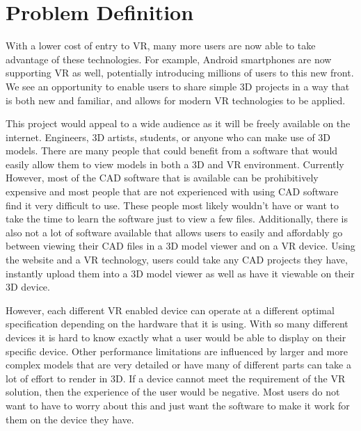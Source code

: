 \documentclass[letterpaper,10pt,draftclsnofoot,onecolumn, titlepage]{IEEEtran}
\begin{document}
\section{Problem Definition}
{With a lower cost of entry to VR, many more users are now able to take advantage of these technologies. For example, Android smartphones are now supporting VR as well, potentially introducing millions of users to this new front. We see an opportunity to enable users to share simple 3D projects in a way that is both new and familiar, and allows for modern VR technologies to be applied. 

This project would appeal to a wide audience as it will be freely available on the internet. Engineers, 3D artists, students, or anyone who can make use of 3D models. There are many people that could benefit from a software that would easily allow them to view models in both a 3D and VR environment. Currently However, most of the CAD software that is available can be prohibitively expensive and most people that are not experienced with using CAD software find it very difficult to use. These people most likely wouldn’t have or want to take the time to learn the software just to view a few files. Additionally, there is also not a lot of software available that allows users to easily and affordably go between viewing their CAD files in a 3D model viewer and on a VR device. Using the website and a VR technology, users could take any CAD projects they have, instantly upload them into a 3D model viewer as well as have it viewable on their 3D device. 

However, each different VR enabled device can operate at a different optimal specification depending on the hardware that it is using. With so many different devices it is hard to know exactly what a user would be able to display on their specific device. Other performance limitations are influenced by larger and more complex models that are very detailed or have many of different parts can take a lot of effort to render in 3D. If a device cannot meet the requirement of the VR solution, then the experience of the user would be negative. Most users do not want to have to worry about this and just want the software to make it work for them on the device they have. 

\par}
\end{document}
